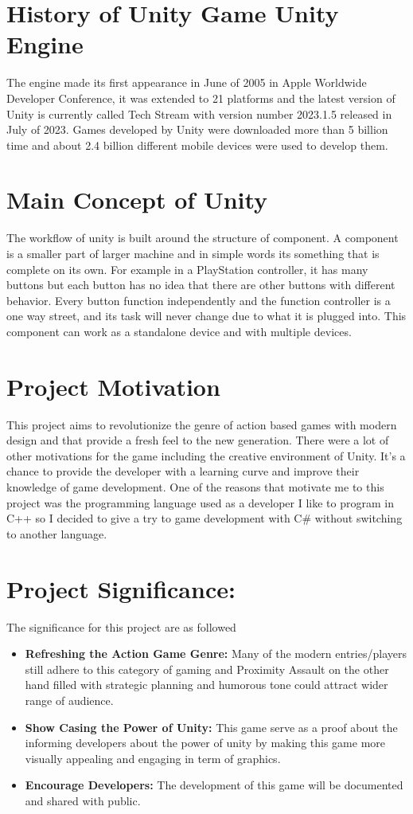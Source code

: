 \section{History of Unity Game Unity Engine}
The engine made its first appearance in June of 2005 in Apple Worldwide Developer Conference, it was extended to 21 platforms and the latest version of Unity is currently called Tech Stream with version number 2023.1.5 released in July of 2023. Games developed by Unity were downloaded more than 5 billion time and about 2.4 billion different mobile devices were used to develop them.
\section{Main Concept of Unity}
The workflow of unity is built around the structure of component. A component is a smaller part of larger machine and in simple words its something that is complete on its own.
For example in a PlayStation controller, it has many buttons but each button has no idea that there are other buttons with different behavior. Every button function independently and the function controller is a one way street, and its task will never change due to what it is plugged into. This component can work as a standalone device and with multiple devices.
\section{Project Motivation}
This project aims to revolutionize the genre of action based games with modern design and that provide a fresh feel to the new generation. There were a lot of other motivations for the game including the creative environment of Unity. It’s a chance to provide the developer with a learning curve and improve their knowledge of game development. One of the reasons that motivate me to this project was the programming language used as a developer I like to program in C++ so I decided to give a try to game development with C\# without switching to another language.
\section{Project Significance:}
The significance for this project are as followed
\begin{itemize}
	\item \textbf{Refreshing the Action Game Genre:}
	Many of the modern entries/players still adhere to this category of gaming and Proximity Assault on the other hand filled with strategic planning and humorous tone could attract wider range of audience.
	\item \textbf{Show Casing the Power of Unity:}
	This game serve as a proof about the informing developers about the power of unity by making this game more visually appealing and engaging in term of graphics.
	\item \textbf{Encourage Developers:}
	The development of this game will be documented and shared with public.
\end{itemize}

